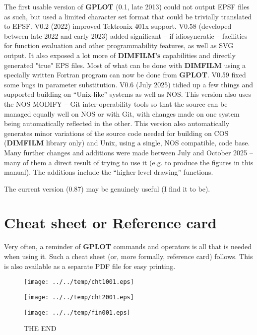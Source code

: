 \documentclass[a4paper,twoside,11pt]{article}
\makeatletter
\def\maxwidth{%
  \ifdim\Gin@nat@width>\linewidth
    \linewidth
  \else
    \Gin@nat@width
  \fi
}
\newcommand{\newpara}{\par\vspace{4mm}\noindent}
\makeatother
\begin{document}
\newpara
The first usable version of \textbf{GPLOT} (0.1, late 2013) 
could not output EPSF files as such, but used a
limited character set format that could be trivially translated to EPSF. V0.2 (2022) improved Tektronix 401x support. V0.58
(developed between late 2022 and early 2023) added significant -- if idiosyncratic -- facilities for function evaluation 
and other programmability features, as well as SVG output. It also exposed a lot more of \textbf{DIMFILM's} capabilities and directly
generated "true" EPS files. Most of what can be done with \textbf{DIMFILM} using a specially
written Fortran program can now be done from \textbf{GPLOT}. V0.59 fixed some bugs in parameter substitution. V0.6 (July 2025)
tidied up a few things and supported building on ``Unix-like'' systems as well as NOS. This version also uses the NOS MODIFY --
Git inter-operability tools so that the source can be managed equally well on NOS or with Git, with changes made on one system
being automatically reflected in the other. This version also automatically generates minor variations of the source code
needed for building on COS (\textbf{DIMFILM} library only) and Unix, using a single, NOS compatible,
code base. Many further changes and additions were made
between July and October 2025 -- many of them a direct result of trying to use it (e.g. to produce the figures
in this manual). The additions include the ``higher level drawing'' functions.

\newpara
The current version (0.87) may be genuinely useful (I find it to be).

\section{Cheat sheet or Reference card}
Very often, a reminder of \textbf{GPLOT} commands and operators is all that is needed when
using it. Such a cheat sheet (or, more formally, reference card) follows. This is
also available as a separate PDF file for easy printing.

\clearpage
\begin{figure}
  \centering
  \texttt{[image: ../../temp/cht1001.eps]}
\end{figure}


\clearpage
\begin{figure}
  \centering
  \texttt{[image: ../../temp/cht2001.eps]}
  \label{fig:cht2001}
\end{figure}


\clearpage
\begin{figure}
  \centering
  \texttt{[image: ../../temp/fin001.eps]}
  \caption{THE END}
  \label{fig:fin001}
\end{figure}
\end{document}
